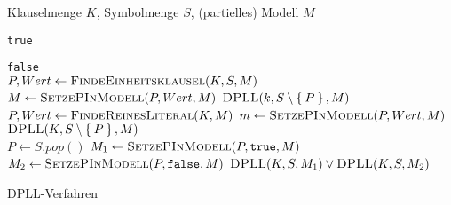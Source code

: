 \documentclass{article}
\begin{document}
\begin{preview}
    \begin{algorithm}[H]
        \begin{algorithmic}
            \Require Klauselmenge $K$, Symbolmenge $S$, (partielles) Modell $M$

                \State \Return \texttt{true}
            \EndIf

                \State \Return \texttt{false}
            \EndIf
			\\

            \State $P, Wert \gets \Call{FindeEinheitsklausel}{K, S, M}$
                \State $M \gets \Call{SetzePInModell}{P, Wert, M}$
                \State \Return $\Call{DPLL}{k, S \setminus \Set{P}, M}$
            \EndIf
			\\

            \State $P, Wert \gets \Call{FindeReinesLiteral}{K, M}$
                \State $m \gets \Call{SetzePInModell}{P, Wert, M}$
                \State \Return $\Call{DPLL}{K, S \setminus \Set{P}, M}$
            \EndIf
			\\

            \State $P \gets S.pop()$ 
            \State $M_1 \gets \Call{SetzePInModell}{P, \texttt{true}, M}$
            \State $M_2 \gets \Call{SetzePInModell}{P, \texttt{false}, M}$
            \State \Return $\Call{DPLL}{K, S, M_1} \lor \Call{DPLL}{K, S, M_2}$
			\EndProcedure
        \end{algorithmic}
    \caption{DPLL-Verfahren}
    \label{alg:dpll}
    \end{algorithm}
\end{preview}
\end{document}
